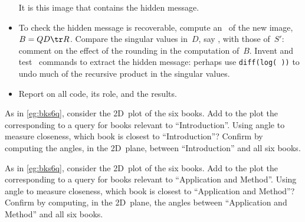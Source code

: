 \begin{exercise}
\begin{itemize}
It is this image that contains the hidden message.

\item To check the hidden message is recoverable, compute an \svd\ of the new image, \(B=QD\tr R\).
Compare the singular values in~\(D\), say \hlist{}, with those of~\(S'\): comment on the effect of the rounding in the computation of~\(B\).
Invent and test \script\ commands to extract the hidden message: 
perhaps use \verb|diff(log( ))| to undo much of the recursive product in the singular values.

\item Report on all code, its role, and the results.

\end{itemize}
\end{exercise}





\begin{comment}
Exercises on colour images, perhaps rounding 0-1 images such as fingerprints, also on PCA, LSI, and possibly SSA.
\end{comment}




\begin{exercise} \label{ex:} 
As in \autoref{eg:bks6q}, consider the 2D~plot of the six books. Add to the plot the  corresponding to a query for books relevant to ``Introduction''.
Using angle to measure closeness, which book is closest to ``Introduction''?  
Confirm by computing the angles, in the 2D~plane, between ``Introduction'' and all six books.
\end{exercise}



\begin{exercise} \label{ex:} 
As in \autoref{eg:bks6q}, consider the 2D~plot of the six books. Add to the plot the  corresponding to a query for books relevant to ``Application and Method''.
Using angle to measure closeness, which book is closest to ``Application and Method''?  
Confirm by computing, in the 2D~plane, the angles between ``Application and Method'' and all six books.
\end{exercise}





